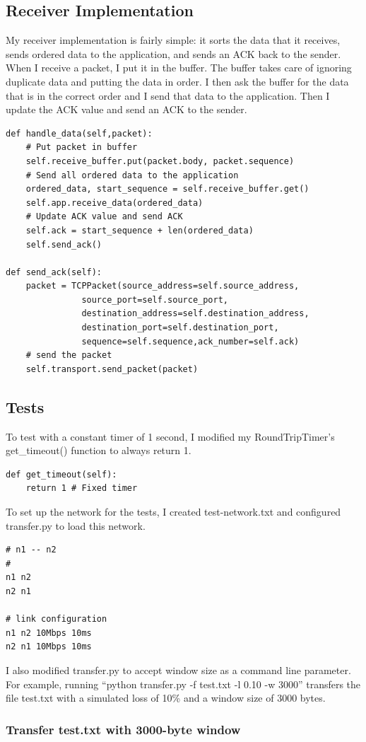 \documentclass[11pt]{article}
\begin{document}
\subsection{Receiver Implementation}
My receiver implementation is fairly simple: it sorts the data that it receives, sends ordered data to the application, and sends an ACK back to the sender. When I receive a packet, I put it in the buffer. The buffer takes care of ignoring duplicate data and putting the data in order. I then ask the buffer for the data that is in the correct order and I send that data to the application. Then I update the ACK value and send an ACK to the sender.
\begin{lstlisting}
def handle_data(self,packet):
	# Put packet in buffer
	self.receive_buffer.put(packet.body, packet.sequence)
	# Send all ordered data to the application
	ordered_data, start_sequence = self.receive_buffer.get()
	self.app.receive_data(ordered_data)
	# Update ACK value and send ACK
	self.ack = start_sequence + len(ordered_data)
	self.send_ack()

def send_ack(self):
	packet = TCPPacket(source_address=self.source_address,
			   source_port=self.source_port,
			   destination_address=self.destination_address,
			   destination_port=self.destination_port,
			   sequence=self.sequence,ack_number=self.ack)
	# send the packet
	self.transport.send_packet(packet)
\end{lstlisting}
\subsection{Tests}
To test with a constant timer of 1 second, I modified my RoundTripTimer's get\_timeout() function to always return 1.
\begin{lstlisting}
def get_timeout(self):
	return 1 # Fixed timer
\end{lstlisting}
To set up the network for the tests, I created test-network.txt and configured transfer.py to load this network.
\begin{lstlisting}
# n1 -- n2
#
n1 n2
n2 n1

# link configuration
n1 n2 10Mbps 10ms
n2 n1 10Mbps 10ms
\end{lstlisting}
I also modified transfer.py to accept window size as a command line parameter. For example, running ``python transfer.py -f test.txt -l 0.10 -w 3000'' transfers the file test.txt with a simulated loss of 10\% and a window size of 3000 bytes.
\pagebreak
\subsubsection{Transfer test.txt with 3000-byte window}
\end{document}
